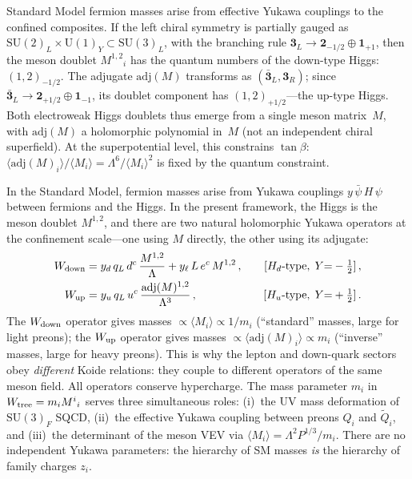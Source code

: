 \documentclass[12pt,a4paper]{article}
\newcommand{\SU}{\mathrm{SU}}
\newcommand{\UU}{\mathrm{U}}
\newcommand{\adj}{\mathrm{adj}}
\begin{document}
Standard Model fermion masses arise from effective Yukawa couplings
to the confined composites. If the left chiral symmetry is partially
gauged as $\SU(2)_L \times \UU(1)_Y \subset \SU(3)_L$, with the
branching rule $\mathbf{3}_L \to \mathbf{2}_{-1/2} \oplus
\mathbf{1}_{+1}$, then the meson doublet $M^{1,2}{}_i$ has the
quantum numbers of the down-type Higgs: $(1,2)_{-1/2}$. The adjugate
$\adj(M)$ transforms as $(\bar{\mathbf{3}}_L, \mathbf{3}_R)$; since
$\bar{\mathbf{3}}_L \to \mathbf{2}_{+1/2} \oplus
\mathbf{1}_{-1}$, its doublet component has $(1,2)_{+1/2}$---the
up-type Higgs. Both electroweak Higgs doublets thus emerge from a
single meson matrix~$M$, with $\adj(M)$ a holomorphic polynomial in~$M$
(not an independent chiral superfield). At the superpotential level,
this constrains $\tan\beta$: $\langle\adj(M)_i\rangle/\langle M_i\rangle
= \Lambda^6/\langle M_i\rangle^2$ is fixed by the quantum constraint.

In the Standard Model, fermion masses arise from Yukawa couplings
$y\,\bar\psi\,H\,\psi$ between fermions and the Higgs.
In the present framework, the Higgs is the meson doublet $M^{1,2}$,
and there are two natural holomorphic Yukawa operators at the
confinement scale---one using $M$ directly, the other using its
adjugate:
\begin{align}
  W_{\rm down} &= y_d\,q_L\,d^c\,\frac{M^{1,2}}{\Lambda}
  + y_\ell\,L\,e^c\,M^{1,2}\,,
  &\quad [H_d\text{-type},\; Y{=}-\tfrac{1}{2}]\,,
  \label{eq:W1} \\
  W_{\rm up} &= y_u\,q_L\,u^c\,\frac{\adj(M)^{1,2}}{\Lambda^3}\,,
  &\quad [H_u\text{-type},\; Y{=}+\tfrac{1}{2}]\,.
  \label{eq:W2}
\end{align}
The $W_{\rm down}$ operator gives masses $\propto \langle M_i
\rangle \propto 1/m_i$ (``standard'' masses, large for light
preons); the $W_{\rm up}$ operator gives masses $\propto
\langle\adj(M)_i\rangle \propto m_i$ (``inverse'' masses, large
for heavy preons). This is why the lepton and down-quark sectors
obey \emph{different} Koide relations: they couple to different
operators of the same meson field.
All operators conserve hypercharge.
The mass parameter $m_i$ in $W_{\rm tree} = m_i M^i{}_i$ serves three
simultaneous roles: (i)~the UV mass deformation of $\SU(3)_F$ SQCD,
(ii)~the effective Yukawa coupling between preons $Q_i$ and $\tilde Q_i$,
and (iii)~the determinant of the meson VEV via
$\langle M_i\rangle = \Lambda^2 P^{1/3}/m_i$. There are no independent
Yukawa parameters: the hierarchy of SM masses \emph{is} the hierarchy of
family charges $z_i$.
\end{document}
